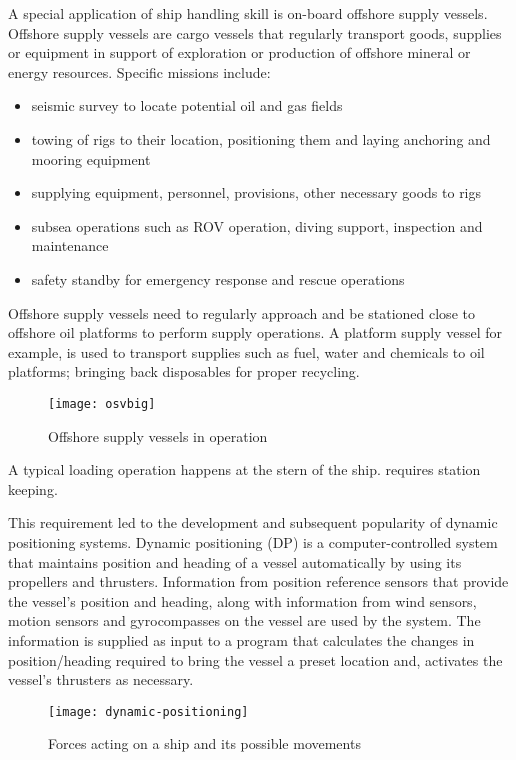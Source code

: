 A special application of ship handling skill is on-board offshore supply vessels. Offshore supply vessels are cargo vessels that regularly transport goods, supplies or equipment in support of exploration or production of offshore mineral or energy resources. Specific missions include: 
\begin{itemize}[noitemsep]
\item seismic survey to locate potential oil and gas fields
\item towing of rigs to their location, positioning them and laying anchoring and mooring equipment
\item supplying equipment, personnel, provisions, other necessary goods to rigs
\item subsea operations such as ROV operation, diving support, inspection and maintenance
\item safety standby for emergency response and rescue operations
\end{itemize}
 Offshore supply vessels need to regularly approach and be stationed close to offshore oil platforms to perform supply operations. A platform supply vessel for example, is used to transport supplies such as fuel, water and chemicals to oil platforms; bringing back disposables for proper recycling. 
\begin{figure}[hb]
	\centering
	\texttt{[image: osvbig]}
	\caption{Offshore supply vessels in operation}
	\label{fig:shipforces}
\end{figure}

A typical loading operation happens at the stern of the ship. requires station keeping.


This requirement led to the development and subsequent popularity of dynamic positioning systems. Dynamic positioning (DP) is a computer-controlled system that maintains position and heading of a vessel automatically by using its propellers and thrusters. Information from position reference sensors that provide the vessel’s position and heading, along with information from wind sensors, motion sensors and gyrocompasses on the vessel are used by the system. The information is supplied as input to a program that calculates the changes in position/heading required to bring the vessel a preset location and, activates the vessel’s thrusters as necessary.

\begin{figure}
	\centering
	\texttt{[image: dynamic-positioning]}
	\caption{Forces acting on a ship and its possible movements}
	\label{fig:shipforces}
\end{figure}

